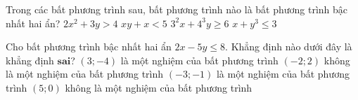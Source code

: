 \begin{ex}
Trong các bất phương trình sau, bất phương trình nào là bất phương trình bậc nhất hai ẩn?
\choice
{$2x^2+3y>4$}
{$xy+x<5$}
{\True $3^2x+4^3y \geq 6$}
{$x+y^3 \leq 3$}
\end{ex}

\begin{ex}
Cho bất phương trình bậc nhất hai ẩn $2 x-5 y \leq 8$. Khẳng định nào dưới đây là khẳng định $\textbf{sai}$?
\choice
{$(3 ;-4)$ là một nghiệm của bất phương trình}
{\True $(-2 ; 2)$ không là một nghiệm của bất phương trình}
{$(-3 ;-1)$ là một nghiệm của bất phương trình}
{$(5 ; 0)$ không là một nghiệm của bất phương trình}
\end{ex}
